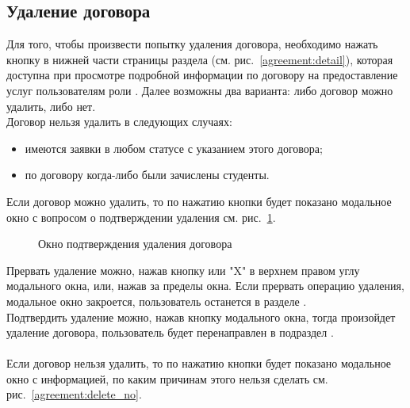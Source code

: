 \subsection{Удаление договора}
Для того, чтобы произвести попытку удаления договора, необходимо нажать кнопку  в нижней части страницы раздела  (см. рис.~\ref{agreement:detail}), которая доступна при просмотре подробной информации по договору на предоставление услуг пользователям роли . Далее возможны два варианта: либо договор можно удалить, либо нет.\\
Договор нельзя удалить в следующих случаях:
\begin{itemize}
	\item имеются заявки в любом статусе с указанием этого договора;
	\item по договору когда-либо были зачислены студенты.
\end{itemize} 
Если договор можно удалить, то по нажатию кнопки  будет показано модальное окно с вопросом о подтверждении удаления см. рис.~\ref{agreement:delete_yes}.

\begin{figure}[H]
	\caption{Окно подтверждения удаления договора}
	\label{agreement:delete_yes}
\end{figure}

Прервать удаление можно, нажав кнопку  или "X" в верхнем правом углу модального окна, или, нажав за пределы окна. Если прервать операцию удаления, модальное окно закроется, пользователь останется в разделе .\\
Подтвердить удаление можно, нажав кнопку  модального окна, тогда произойдет удаление договора, пользователь будет перенаправлен в подраздел . \\ \\
Если договор нельзя удалить, то по нажатию кнопки  будет показано модальное окно с информацией, по каким причинам этого нельзя сделать см. рис.~\ref{agreement:delete_no}.

